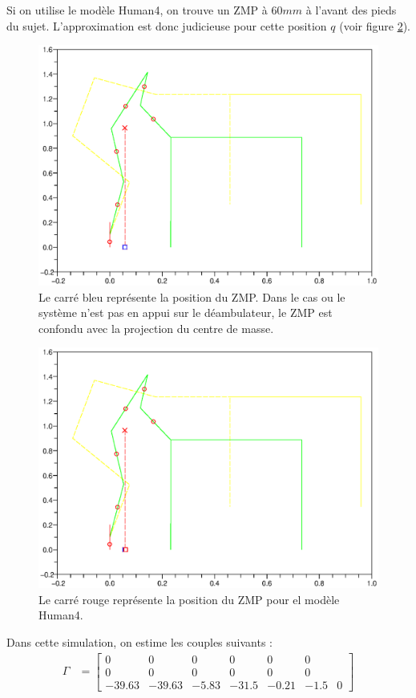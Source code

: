 \documentclass[a4paper, 10pt ]{article}
\begin{document}
Si on utilise le modèle Human4, on trouve un ZMP à $60mm$ à l'avant des pieds du sujet. L'approximation est donc judicieuse pour cette position $q$ (voir figure \ref{fig:ZMPHu4_0}). 

 \begin{figure}[h]
\centering
\includegraphics[width=0.8\columnwidth]{images/simu/Fext0/ZMP.eps}
\caption{Le carré bleu représente la position du ZMP. Dans le cas ou le système n'est pas en appui sur le déambulateur, le ZMP est confondu avec la projection du centre de masse.}
\label{fig:ZMP}
\end{figure}

 \begin{figure}[h]
\centering
\includegraphics[width=0.8\columnwidth]{images/simu/Fext0/ZMPHu4.eps}
\caption{Le carré rouge représente la position du ZMP pour el modèle Human4. }
\label{fig:ZMPHu4_0}
\end{figure}

Dans cette simulation, on estime les couples suivants : 
\begin{align}
\Gamma & = 
	\begin{bmatrix}
		0&0&0&0&0&0\\
		0&0&0&0&0&0\\
		-39.63&-39.63&-5.83&-31.5&-0.21&-1.5&0
	\end{bmatrix}
\end{align}
\end{document}
